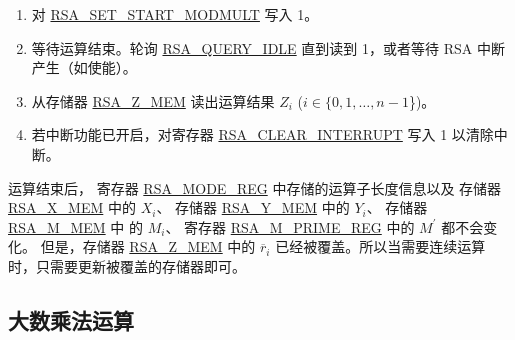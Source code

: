 \documentclass[main\_\_CN.tex]{subfiles}
\begin{document}
\begin{enumerate}
        只需按运算子长度向各存储器写入有效数据；超出该长度的数据将被忽略。

    \item 对 \hyperref[fielddesc:RSASETSTARTMODMULT]{RSA\_SET\_START\_MODMULT} 写入 1。

    \item 等待运算结束。轮询 \hyperref[fielddesc:RSAQUERYIDLE]{RSA\_QUERY\_IDLE} 直到读到 1，或者等待 RSA 中断产生（如使能）。

    \item 从存储器 \hyperref[regdesc:RSAmemory]{RSA\_Z\_MEM} 读出运算结果 \begin{math}Z_{i}\end{math} (\begin{math}i \in \{ 0, 1, \dots, n-1 \end{math}\})。

    \item 若中断功能已开启，对寄存器 \hyperref[fielddesc:RSACLEARINTERRUPT]{RSA\_CLEAR\_INTERRUPT} 写入 1 以清除中断。

\end{enumerate}


运算结束后，
寄存器 \hyperref[regdesc:RSAMODEREG]{RSA\_MODE\_REG} 中存储的运算子长度信息以及
存储器 \hyperref[regdesc:RSAmemory]{RSA\_X\_MEM} 中的 \begin{math}X_{i}\end{math}、
存储器 \hyperref[regdesc:RSAmemory]{RSA\_Y\_MEM} 中的 \begin{math}Y_{i}\end{math}、
存储器 \hyperref[regdesc:RSAmemory]{RSA\_M\_MEM} 中 的 \begin{math}M_{i}\end{math}、
寄存器 \hyperref[regdesc:RSAMPRIMEREG]{RSA\_M\_PRIME\_REG} 中的 \begin{math}M^{\prime}\end{math} 都不会变化。
但是，存储器 \hyperref[regdesc:RSAmemory]{RSA\_Z\_MEM} 中的 \begin{math}\overline{r}_{i}\end{math}
已经被覆盖。所以当需要连续运算时，只需要更新被覆盖的存储器即可。


\subsection{大数乘法运算}
\end{document}
